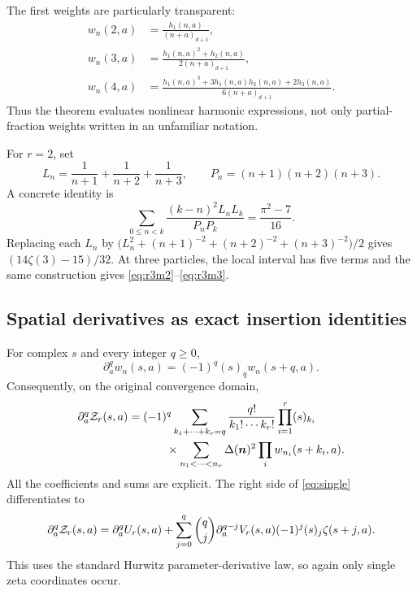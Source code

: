 The first weights are particularly transparent:
\begin{align*}
 w_n(2,a)&=\frac{h_1(n,a)}{(n+a)_{d+1}},\\
 w_n(3,a)&=\frac{h_1(n,a)^2+h_2(n,a)}{2(n+a)_{d+1}},\\
 w_n(4,a)&=\frac{h_1(n,a)^3+3h_1(n,a)h_2(n,a)+2h_3(n,a)}
                  {6(n+a)_{d+1}}.
\end{align*}
Thus the theorem evaluates nonlinear harmonic expressions, not only
partial-fraction weights written in an unfamiliar notation.

For $r=2$, set
\[
 L_n=\frac1{n+1}+\frac1{n+2}+\frac1{n+3},\qquad
 P_n=(n+1)(n+2)(n+3).
\]
A concrete identity is
\begin{equation}\label{eq:concrete-harmonic}
 \boxed{\displaystyle
 \sum_{0\le n<k}\frac{(k-n)^2L_nL_k}{P_nP_k}
       =\frac{\pi^2-7}{16}.}
\end{equation}
Replacing each $L_n$ by
$\bigl(L_n^2+(n+1)^{-2}+(n+2)^{-2}+(n+3)^{-2}\bigr)/2$
gives $(14\zeta(3)-15)/32$. At three particles, the local interval
has five terms and the same construction gives
\eqref{eq:r3m2}--\eqref{eq:r3m3}.

\subsection{Spatial derivatives as exact insertion identities}
For complex $s$ and every integer $q\ge0$,
\begin{equation}\label{eq:shift-weight}
 \partial_a^q w_n(s,a)=(-1)^q(s)_q w_n(s+q,a).
\end{equation}
Consequently, on the original convergence domain,
\begin{align}
 \partial_a^q\mathcal Z_r(s,a)
 ={}&(-1)^q\sum_{k_1+\cdots+k_r=q}
    \frac{q!}{k_1!\cdots k_r!}\prod_{i=1}^r(s)_{k_i}\notag\\
 &\qquad\times\sum_{n_1<\cdots<n_r}\Delta(\bm n)^2
       \prod_i w_{n_i}(s+k_i,a).
 \label{eq:insertion-ladder}
\end{align}
All the coefficients and sums are explicit. The right side of
\eqref{eq:single} differentiates to
\begin{equation}\label{eq:spatial-zeta}
 \partial_a^q\mathcal Z_r(s,a)=\partial_a^q U_r(s,a)
 +\sum_{j=0}^q\binom qj\partial_a^{q-j}V_r(s,a)
          (-1)^j(s)_j\zeta(s+j,a).
\end{equation}
This uses the standard Hurwitz parameter-derivative law, so again only
single zeta coordinates occur.

